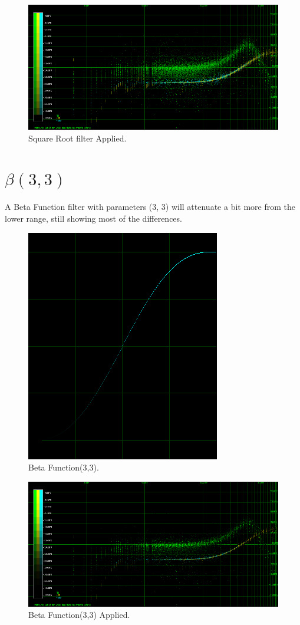 \documentclass[10pt,a4paper]{report}
\begin{document}
\begin{appendices}
\begin{figure}[H]
	\centering
	\includegraphics[width=1\linewidth]{images/colorfilter/BetaFunctionPlot_1_Data.png}
	\caption[Square Root filter]{Square Root filter Applied.}
	\label{fig:betafunctionplot1data}
\end{figure}

\section{$\beta(3,3)$}

A Beta Function filter with parameters (3, 3) will attenuate a bit more from the lower range, still showing most of the differences.

\begin{figure}[H]
	\centering
	\includegraphics[width=0.4\linewidth]{images/colorfilter/BetaFunctionPlot_2.png}
	\caption[Beta Function(3,3)]{Beta Function(3,3).}
	\label{fig:betafunctionplot2}
\end{figure}

\begin{figure}[H]
	\centering
	\includegraphics[width=1\linewidth]{images/colorfilter/BetaFunctionPlot_2_Data.png}
	\caption[Beta Function(3,3)]{Beta Function(3,3) Applied.}
	\label{fig:betafunctionplot2data}
\end{figure}


\end{appendices}
\end{document}
